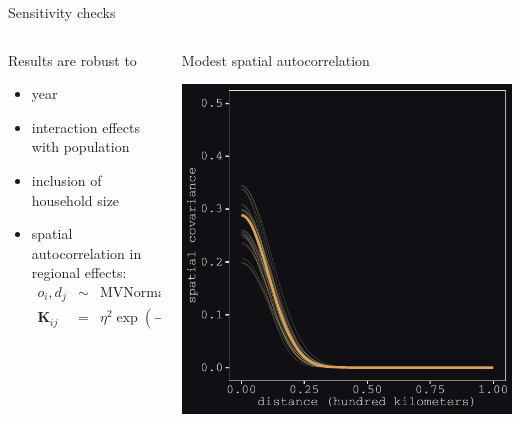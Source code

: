 \documentclass{beamer}
\begin{document}
\begin{frame}{Sensitivity checks}
			\begin{columns}
		\begin{column}{0.5\textwidth}
				Results are \alert{robust} to
				\begin{itemize}
					\item year\pause
					\item interaction effects with population \pause
				  \item inclusion of household size \pause
				  \item spatial autocorrelation in regional effects:
					\begin{eqnarray*}
					  o_{i}, d_{j}& \sim &\text{MVNormal}(0, \mathbf{K})\\
					  \mathbf{K}_{ij} & = & \eta^{2}\exp(-\rho^{2}\mathbf{D}_{ij})
					\end{eqnarray*}
					\pause
				  \end{itemize}
		\end{column}
		\begin{column}{0.5\textwidth}
			\alert{Modest} spatial autocorrelation
			\begin{center}
				\includegraphics[width=\textwidth]{../../fig/spatial_autocorrelation}
			\end{center}
		\end{column}
	\end{columns}
\end{frame}
\end{document}

